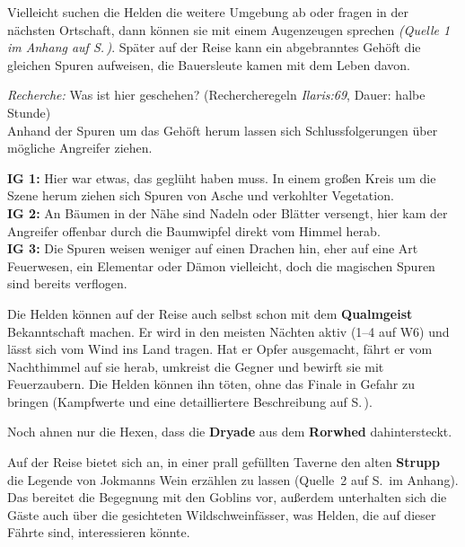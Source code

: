 Vielleicht suchen die Helden die weitere Umgebung ab oder fragen in der nächsten Ortschaft, dann können sie mit einem Augenzeugen sprechen \emph{(Quelle 1 im Anhang auf S.\,\pageref{aiw_quelle1})}.
Später auf der Reise kann ein abgebranntes Gehöft die gleichen Spuren aufweisen, die Bauersleute kamen mit dem Leben davon.


{\emph{Recherche:} Was ist hier geschehen? (Rechercheregeln \emph{Ilaris:69}, Dauer: halbe Stunde)\\
Anhand der Spuren um das Gehöft herum lassen sich Schlussfolgerungen über mögliche Angreifer ziehen.

\textbf{IG 1:} Hier war etwas, das geglüht haben muss. In einem großen Kreis um die Szene herum ziehen sich Spuren von Asche und verkohlter Vegetation.\\
\textbf{IG 2:} An Bäumen in der Nähe sind Nadeln oder Blätter versengt, hier kam der Angreifer offenbar durch die Baumwipfel direkt vom Himmel herab.\\
\textbf{IG 3:} Die Spuren weisen weniger auf einen Drachen hin, eher auf eine Art Feuerwesen, ein Elementar oder Dämon vielleicht, doch die magischen Spuren sind bereits verflogen.
}

\vfill

Die Helden können auf der Reise auch selbst schon mit dem \textbf{Qualmgeist} Bekanntschaft machen.
Er wird in den meisten Nächten aktiv (1--4 auf W6) und lässt sich vom Wind ins Land tragen.
Hat er Opfer ausgemacht, fährt er vom Nachthimmel auf sie herab, umkreist die Gegner und bewirft sie mit Feuerzaubern.
Die Helden können ihn töten, ohne das Finale in Gefahr zu bringen (Kampfwerte und eine detailliertere Beschreibung auf S.\,\pageref{geist}).

Noch ahnen nur die Hexen, dass die \textbf{Dryade} aus dem \textbf{Rorwhed} dahintersteckt.

\newpage

Auf der Reise bietet sich an, in einer prall gefüllten Taverne den alten \textbf{Strupp} die Legende von Jokmanns Wein erzählen zu lassen (Quelle~2 auf S.\,\pageref{aiw_quelle2} im Anhang).
Das bereitet die Begegnung mit den Goblins vor, außerdem unterhalten sich die Gäste auch über die gesichteten Wildschweinfässer, was Helden, die auf dieser Fährte sind, interessieren könnte.

